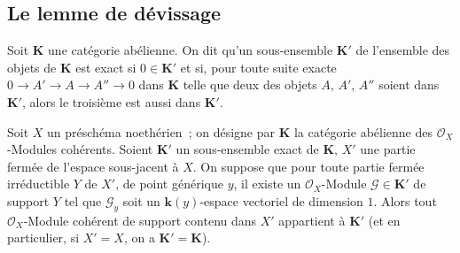 \subsection{Le lemme de dévissage}
\label{subsection:III.3.1-fr}

\begin{definition}[3.1.1]
\label{III.3.1.1-fr}
Soit $\boldsymbol{K}$ une catégorie abélienne. On dit qu'un sous-ensemble $\boldsymbol{K}'$ de
l'ensemble des objets de $\boldsymbol{K}$ est exact si $0\in\boldsymbol{K}'$ et si, pour toute
suite exacte
$0\to A'\to A\to A''\to0$
dans $\boldsymbol{K}$ telle que deux des objets $A$, $A'$, $A''$ soient dans $\boldsymbol{K}'$, alors le
troisième est aussi dans $\boldsymbol{K}'$.
\end{definition}

\begin{theorem}[3.1.2]
\label{III.3.1.2-fr}
Soit $X$ un préschéma noethérien~; on désigne par $\boldsymbol{K}$ la catégorie abélienne
des $\mathcal O_X$-Modules cohérents. Soient $\boldsymbol{K}'$ un sous-ensemble exact de
$\boldsymbol{K}$, $X'$ une partie fermée de l'espace sous-jacent à $X$. On suppose que
pour toute partie fermée irréductible $Y$ de $X'$, de point générique $y$, il
existe un $\mathcal O_X$-Module $\mathcal G\in\boldsymbol{K}'$ de support $Y$ tel que $\mathcal G_y$ soit
un $\boldsymbol{k}(y)$-espace vectoriel de dimension $1$. Alors tout $\mathcal O_X$-Module
cohérent de support contenu dans $X'$ appartient à $\boldsymbol{K}'$ (et en particulier,
si $X'=X$, on a $\boldsymbol{K}'=\boldsymbol{K}$).
\end{theorem}

